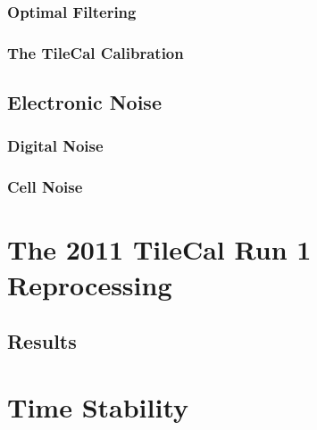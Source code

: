 \documentclass[10pt,twoside,cucitura,classica,openany]{toptesi}
\begin{document}


\subsubsection{Optimal Filtering}
\label{sec:optimal-filtering}



\subsubsection{The TileCal Calibration}
\label{sec:tilecal-calibration}



\subsection{Electronic Noise}
\label{sec:electronic-noise}



\subsubsection{Digital Noise}
\label{sec:digital-noise}



\subsubsection{Cell Noise}
\label{sec:cell-noise}



\section{The 2011 TileCal Run 1 Reprocessing}
\label{sec:2011-tilecal-run}



\subsection{Results}
\label{sec:results-1}



\section{Time Stability}
\label{sec:time-stability}
\end{document}
